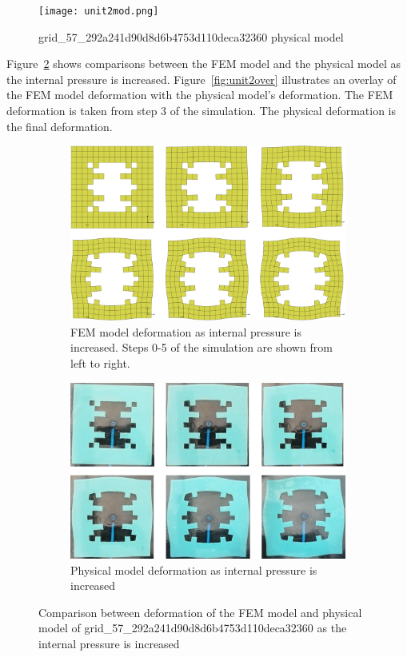 \begin{figure}[H]
	\centering
	\texttt{[image: unit2mod.png]}
	\caption[Physical validation model of unit 2]{grid\_57\_292a241d90d8d6b4753d110deca32360 physical model}
	\label{fig:unit2mod}
\end{figure}

Figure~\ref{fig:unit2def} shows comparisons between the FEM model and the physical model as the internal pressure is increased. Figure~\ref{fig:unit2over} illustrates an overlay of the FEM model deformation with the physical model's deformation. The FEM deformation is taken from step 3 of the simulation. The physical deformation is the final deformation.

\begin{figure}[H]
	\centering
	\begin{subfigure}[c]{\textwidth}
		\centering
		\includegraphics[width=\textwidth]{unit2deffem.png}
		\caption{FEM model deformation as internal pressure is increased. Steps 0-5 of the simulation are shown from left to right.}
	\end{subfigure}
	\hfill
	\begin{subfigure}[c]{\textwidth}
		\centering
		\includegraphics[width=\textwidth]{unit2defmod.png}
		\caption{Physical model deformation as internal pressure is increased}
	\end{subfigure}
	\caption[Comparison between FEM and physical models of unit 2]{Comparison between deformation of the FEM model and physical model of grid\_57\_292a241d90d8d6b4753d110deca32360 as the internal pressure is increased}
	\label{fig:unit2def}
\end{figure}

